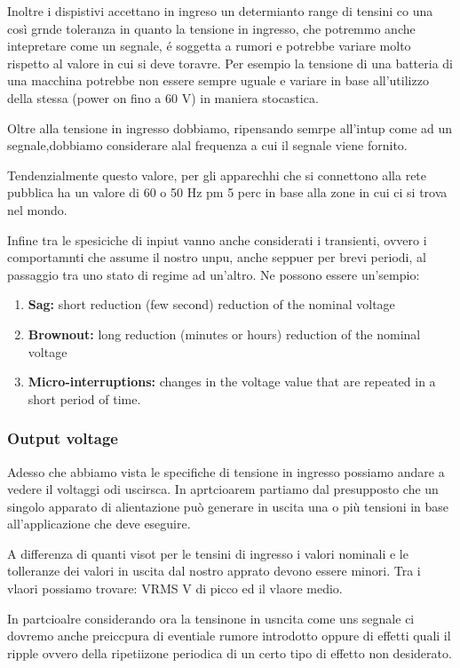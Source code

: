 \documentclass[../main.tex]{subfiles}
\begin{document}
Inoltre i dispistivi accettano in ingreso un determianto range di tensini co una così grnde toleranza in quanto la tensione in ingresso, che potremmo anche intepretare come un segnale, é soggetta a rumori e potrebbe variare molto rispetto al valore in cui si deve toravre. Per esempio la tensione di una batteria di una macchina potrebbe non essere sempre  uguale e variare in base all'utilizzo della stessa (power on fino a 60 V) in maniera stocastica.

Oltre alla tensione in ingresso dobbiamo, ripensando semrpe all'intup come ad un segnale,dobbiamo considerare alal frequenza a cui il segnale viene fornito.

Tendenzialmente questo valore, per gli apparechhi che si connettono alla rete pubblica ha un valore di 60 o 50 Hz pm 5 perc in base alla zone in cui ci si trova nel mondo.

Infine tra le spesiciche di inpiut vanno anche considerati i transienti, ovvero i comportamnti che assume il nostro unpu, anche seppuer per brevi periodi, al passaggio tra uno stato di regime ad un'altro. Ne possono essere un'sempio:

\begin{enumerate}
	\item[\textbf{-}] \textbf{Sag:} short reduction (few second) reduction of the nominal voltage
	\item[\textbf{-}] \textbf{Brownout:} long reduction (minutes or hours) reduction of the nominal voltage
	\item[\textbf{-}] \textbf{Micro-interruptions:} changes in the voltage value that are repeated in a short period of time.
\end{enumerate}

\subsubsection*{Output voltage}

Adesso che abbiamo vista le specifiche di tensione in ingresso possiamo andare a vedere il voltaggi odi uscirsca. In aprtcioarem partiamo dal presupposto che un singolo apparato di alientazione può generare in uscita una o più tensioni in base all'applicazione che deve eseguire.

A differenza di quanti visot per le tensini di ingresso i valori nominali e le tolleranze dei valori in uscita dal nostro apprato devono essere minori. Tra i vlaori possiamo trovare: VRMS V di picco ed il vlaore medio.

In partcioalre considerando ora la tensinone in usncita come uns segnale ci dovremo anche preiccpura di eventiale rumore introdotto oppure di effetti quali il ripple ovvero della ripetiizone periodica di un certo tipo di effetto non desiderato. 
\end{document}
